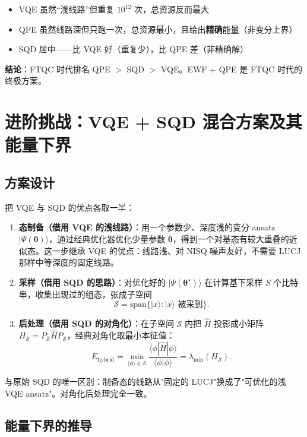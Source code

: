 \documentclass[11pt,a4paper]{article}
\begin{document}
\begin{itemize}
  \item VQE 虽然``浅线路''但重复 $10^{12}$ 次，总资源反而最大
  \item QPE 虽然线路深但只跑一次，总资源最小，且给出\textbf{精确}能量（非变分上界）
  \item SQD 居中——比 VQE 好（重复少），比 QPE 差（非精确解）
\end{itemize}

\textbf{结论}：FTQC 时代排名 QPE $>$ SQD $>$ VQE。EWF + QPE 是 FTQC 时代的终极方案。

\section*{进阶挑战：VQE + SQD 混合方案及其能量下界}

\subsection*{方案设计}

把 VQE 与 SQD 的优点各取一半：

\begin{enumerate}[label=\textbf{步骤 \arabic*.}]
  \item \textbf{态制备（借用 VQE 的浅线路）}：用一个参数少、深度浅的变分 ansatz $|\Psi(\boldsymbol\theta)\rangle$，通过经典优化器优化少量参数 $\boldsymbol\theta$，得到一个对基态有较大重叠的近似态。这一步继承 VQE 的优点：线路浅、对 NISQ 噪声友好，不需要 LUCJ 那样中等深度的固定线路。
  \item \textbf{采样（借用 SQD 的思路）}：对优化好的 $|\Psi(\boldsymbol\theta^\star)\rangle$ 在计算基下采样 $S$ 个比特串，收集出现过的组态，张成子空间
  $$\mathcal{S} = \mathrm{span}\{|x\rangle : |x\rangle \text{ 被采到}\}.$$
  \item \textbf{后处理（借用 SQD 的对角化）}：在子空间 $\mathcal{S}$ 内把 $\hat{H}$ 投影成小矩阵 $H_{\mathcal{S}} = P_{\mathcal{S}}\hat{H}P_{\mathcal{S}}$，经典对角化取最小本征值：
  $$E_{\text{hybrid}} = \min_{|\phi\rangle \in \mathcal{S}} \frac{\langle\phi|\hat{H}|\phi\rangle}{\langle\phi|\phi\rangle} = \lambda_{\min}(H_{\mathcal{S}}).$$
\end{enumerate}

与原始 SQD 的唯一区别：制备态的线路从"固定的 LUCJ"换成了"可优化的浅 VQE ansatz"。对角化后处理完全一致。

\subsection*{能量下界的推导}
\end{document}
